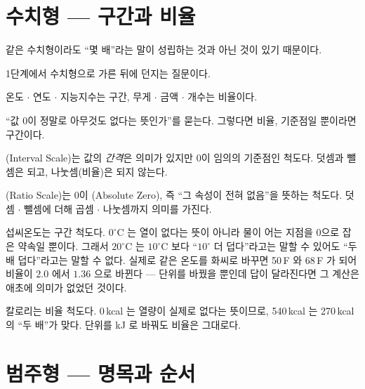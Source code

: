 \section{수치형 --- 구간과 비율}
\label{sec:attr-numeric}

\begin{inbrief}
  \item[Why] 같은 수치형이라도 ``몇 배''라는 말이 성립하는 것과 아닌 것이 있기
             때문이다.
  \item[When] 1단계에서 수치형으로 가른 뒤에 던지는 질문이다.
  \item[Where] 온도 $\cdot$ 연도 $\cdot$ 지능지수는 구간, 무게 $\cdot$ 금액
               $\cdot$ 개수는 비율이다.
  \item[How] ``값 0이 정말로 아무것도 없다는 뜻인가''를 묻는다. 그렇다면 비율,
             기준점일 뿐이라면 구간이다.
\end{inbrief}

\begin{definition}[구간 척도와 비율 척도]
\label{def:interval-ratio}
(Interval Scale)는 값의 \emph{간격}은 의미가 있지만 0이
임의의 기준점인 척도다. 덧셈과 뺄셈은 되고, 나눗셈(비율)은 되지 않는다.

(Ratio Scale)는 0이 (Absolute Zero), 즉
``그 속성이 전혀 없음''을 뜻하는 척도다. 덧셈 $\cdot$ 뺄셈에 더해
곱셈 $\cdot$ 나눗셈까지 의미를 가진다.
\end{definition}

\begin{example}[``두 배''가 성립하는가]
\label{ex:twice}
섭씨온도는 구간 척도다. $0^\circ\mathrm{C}$ 는 열이 없다는 뜻이 아니라 물이 어는
지점을 0으로 잡은 약속일 뿐이다. 그래서 $20^\circ\mathrm{C}$ 는
$10^\circ\mathrm{C}$ 보다 ``$10^\circ$ 더 덥다''라고는 말할 수 있어도
``두 배 덥다''라고는 말할 수 없다. 실제로 같은 온도를 화씨로 바꾸면 50\,\textdegree F
와 68\,\textdegree F 가 되어 비율이 $2.0$ 에서 $1.36$ 으로 바뀐다 --- 단위를
바꿨을 뿐인데 답이 달라진다면 그 계산은 애초에 의미가 없었던 것이다.

칼로리는 비율 척도다. 0\,kcal 는 열량이 실제로 없다는 뜻이므로,
540\,kcal 는 270\,kcal 의 ``두 배''가 맞다. 단위를 kJ 로 바꿔도 비율은 그대로다.
\end{example}

\section{범주형 --- 명목과 순서}
\label{sec:attr-categorical}


